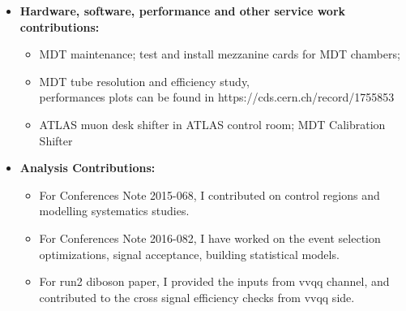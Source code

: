 \begin{itemize}
%

\item \textbf{Hardware, software, performance and other service work contributions:}    

        \begin{itemize}
            \item MDT maintenance; test and install mezzanine cards for MDT chambers;
            \item MDT tube resolution and efficiency study,  \\
                performances plots can be found in https://cds.cern.ch/record/1755853
            \item ATLAS muon desk shifter in ATLAS control room; MDT Calibration Shifter
        \end{itemize}
    
\item \textbf{Analysis Contributions:}

        \begin{itemize}
            \item For Conferences Note 2015-068, I contributed on control regions and modelling systematics studies.
            \item For Conferences Note 2016-082, I have worked on the event selection optimizations, signal acceptance, building 
                statistical models.
            \item For run2 diboson paper, I provided the inputs from vvqq channel, and contributed to the cross signal efficiency checks
                from vvqq side.
        \end{itemize}

\end{itemize}
